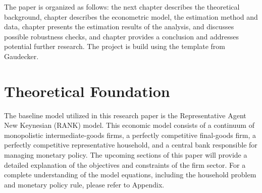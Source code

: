 \documentclass[11pt, a4paper, leqno]{article}
\begin{document}
The paper is organized as follows: the next chapter describes the theoretical background, chapter describes the econometric model, the estimation method and data, chapter presents the estimation results of the analysis, and discusses possible robustness checks, and chapter provides a conclusion and addresses potential further research. The project is build using the template from Gaudecker.



\section{Theoretical Foundation}
The baseline model utilized in this research paper is the Representative Agent New Keynesian (RANK) model. This economic model consists of a continuum of monopolistic intermediate-goods firms, a perfectly competitive final-goods firm, a perfectly competitive representative household, and a central bank responsible for managing monetary policy. The upcoming sections of this paper will provide a detailed explanation of the objectives and constraints of the firm sector. For a complete understanding of the model equations, including the household problem and monetary policy rule, please refer to Appendix.
\end{document}
